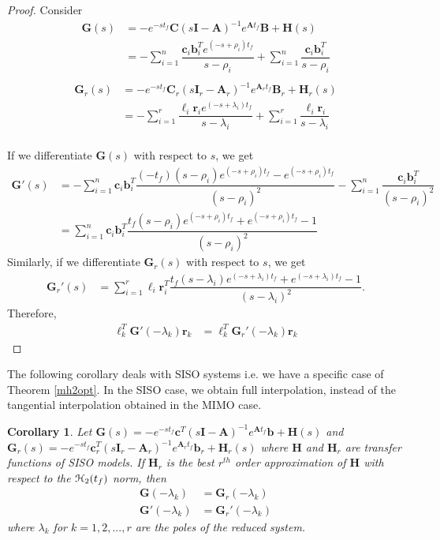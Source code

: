 \documentclass[preprint]{elsarticle}
\newtheorem{corollary}[theorem]{Corollary}
\theoremstyle{definition}
\theoremstyle{definition}
\newcommand{\bfb}{{\boldsymbol{b}}}
\newcommand{\bfc}{{\boldsymbol{c}}}
\def\mathcal{\EuScript}
\numberwithin{equation}{section}
\newcommand{\A}{\mathbf{A}}
\newcommand{\B}{\mathbf{B}}
\newcommand{\I}{\mathbf{I}}
\newcommand{\G}{\mathbf{G}}
\newcommand{\C}{\mathbf{C}}
\newcommand{\HH}{\mathbf{H}}
\newcommand{\tf}{t_f}
\newcommand{\rc}{\boldsymbol{r}}
\newcommand{\lc}{\boldsymbol{\ell}}
\newcommand{\cc}{\boldsymbol{c}}
\newcommand{\bb}{\boldsymbol{b}}
\newcommand{\ch}{\mathcal{H}}
\begin{document}
\begin{proof}
Consider
 \begin{align*}
 \G(s)&=-e^{-s{\tf}}\C(s\I-\A)^{-1}e^{\A {\tf}}\B+\HH(s)\\
 &=-\sum_{i=1}^n\dfrac {\cc_i\bb_i^T e^{(-s+\rho_i){\tf}}}{s-\rho_i}+\sum_{i=1}^n\dfrac{ \cc_i\bb_i^T}{s-\rho_i}\\
 \end{align*}
 \begin{align*}
 \G_r(s)&=-e^{-s{\tf}}\C_r(s\I_r-\A_r)^{-1}e^{\A_r {\tf}}\B_r+\HH_r(s)\\
  &=-\sum_{i=1}^r\dfrac {\lc_i\rc_ie^{(-s+\lambda_i){\tf}}}{s-\lambda_i}+\sum_{i=1}^r\dfrac{ \lc_i\rc_i}{s-\lambda_i}\\
 \end{align*}

 If we differentiate $\G(s)$ with respect to $s$, we get
 \begin{align*}
 \G'(s)&=-\sum_{i=1}^n\cc_i\bb_i^T\dfrac {(-{\tf}) (s-\rho_i)e^{(-s+\rho_i){\tf}}-e^{(-s+\rho_i){\tf}}}{(s-\rho_i)^2}-\sum_{i=1}^n\dfrac{ \cc_i\bb_i^T}{(s-\rho_i)^2}\\
& =\sum_{i=1}^n\cc_i\bb_i^T\dfrac {{\tf} (s-\rho_i)e^{(-s+\rho_i){\tf}}+e^{(-s+\rho_i){\tf}}-1}{(s-\rho_i)^2}
 \end{align*}
Similarly, if we differentiate $\G_r(s)$ with respect to $s$, we get
 \begin{align*}
 \G_r'(s)& =\sum_{i=1}^r\lc_i\rc_i^T\dfrac {{\tf} (s-\lambda_i)e^{(-s+\lambda_i){\tf}}+e^{(-s+\lambda_i){\tf}}-1}{(s-\lambda_i)^2}.
 \end{align*}
Therefore, 
\begin{align*}
\lc_k^T\G'(-\lambda_k)\rc_k&=\lc_k^T\G_r'(-\lambda_k)\rc_k
\end{align*}
\end{proof}


The following corollary deals with SISO systems i.e.  we have a specific case of Theorem \ref{mh2opt}. In the SISO case, we obtain full interpolation, instead of the tangential interpolation obtained in the MIMO case. 

\begin{corollary}\label{h2opt}
Let $\G(s)=-e^{-s{\tf}}\bfc^T(s\I-\A)^{-1}e^{\A {\tf}}\bfb+\HH(s)$ and $\G_r(s)=-e^{-s{\tf}}\bfc^T_r(s\I_r-\A_r)^{-1}e^{\A_r {\tf}}\bfb_r+\HH_r(s)$ where $\HH$ and $\HH_r$ are transfer functions of SISO models.
If $\HH_r$ is the best $r^{th}$ order approximation of $\HH$ with respect to the $\ch_2({\tf})$ norm, then
\begin{align*}
\G(-\lambda_k)&=\G_r(-\lambda_k)\\
\G'(-\lambda_k)&=\G_r'(-\lambda_k)
\end{align*}
where  $\lambda_k$ for $k=1, 2, ... , r$ are the poles of the reduced system.
\end{corollary}
\end{document}
